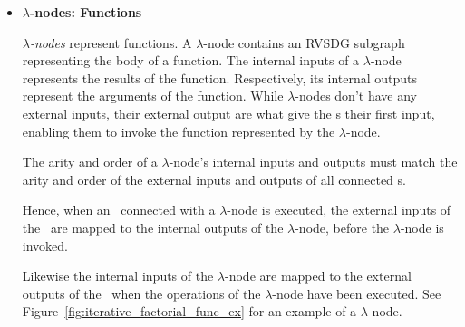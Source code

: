 \begin{itemize}
\item \textbf{$\lambda$-nodes: Functions}

\textit{$\lambda$-nodes} represent functions. A $\lambda$-node contains an RVSDG
subgraph representing the body of a function. The internal inputs of a
$\lambda$-node represents the results of the function. Respectively, its
internal outputs represent the arguments of the function. While $\lambda$-nodes
don't have any external inputs, their external output are what give the
\applyNode s their first input, enabling them to invoke the function represented
by the $\lambda$-node.

The arity and order of a $\lambda$-node's internal inputs and outputs must match
the arity and order of the external inputs and outputs of all connected
\applyNode s.

Hence, when an \applyNode~connected with a $\lambda$-node is executed, the
external inputs of the \applyNode~are mapped to the internal outputs of the
$\lambda$-node, before the $\lambda$-node is invoked.

Likewise the internal inputs of the $\lambda$-node are mapped to the external
outputs of the \applyNode~when the operations of the $\lambda$-node have been
executed. See Figure~\ref{fig:iterative_factorial_func_ex} for an example of a
$\lambda$-node.


\end{itemize}
